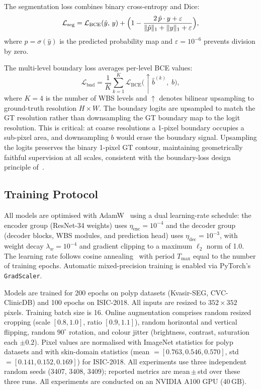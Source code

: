 \documentclass[journal]{IEEEtran}
\begin{document}
The segmentation loss combines binary cross-entropy and Dice:
\begin{equation}
  \mathcal{L}_{\text{seg}} =
    \mathcal{L}_{\text{BCE}}(\hat{y},\,y)
    + \Bigl(1 -
      \frac{2\,\hat{p}\cdot y + \varepsilon}{\|\hat{p}\|_1 + \|y\|_1 + \varepsilon}
    \Bigr),
  \label{eq:seg_loss}
\end{equation}
where $\hat{p} = \sigma(\hat{y})$ is the predicted probability map and
$\varepsilon = 10^{-6}$ prevents division by zero.

The multi-level boundary loss averages per-level BCE values:
\begin{equation}
  \mathcal{L}_{\text{bnd}} = \frac{1}{K}\sum_{k=1}^{K}
    \mathcal{L}_{\text{BCE}}\!\bigl(\uparrow\!\hat{b}^{(k)},\;b\bigr),
  \label{eq:bnd_loss}
\end{equation}
where $K = 4$ is the number of WBS levels and $\uparrow$ denotes bilinear
upsampling to ground-truth resolution $H \times W$.
The boundary logits are upsampled to match the GT resolution rather than
downsampling the GT boundary map to the logit resolution.
This is critical: at coarse resolutions a 1-pixel boundary occupies a
sub-pixel area, and downsampling $b$ would erase the boundary signal.
Upsampling the logits preserves the binary 1-pixel GT contour, maintaining
geometrically faithful supervision at all scales, consistent with the
boundary-loss design principle of~\cite{kervadec2019boundaryloss}.

\subsection{Training Protocol}\label{sec:method:training}

All models are optimised with AdamW~\cite{loshchilov2019adamw} using a
dual learning-rate schedule: the encoder group (ResNet-34 weights) uses
$\eta_{\text{enc}} = 10^{-4}$ and the decoder group (decoder blocks, WBS
modules, and prediction head) uses $\eta_{\text{dec}} = 10^{-3}$, with
weight decay $\lambda_w = 10^{-4}$ and gradient clipping to a maximum
$\ell_2$ norm of 1.0.
The learning rate follows cosine annealing~\cite{loshchilov2017cosine} with
period $T_{\text{max}}$ equal to the number of training epochs.
Automatic mixed-precision training is enabled via PyTorch's
\texttt{GradScaler}.

Models are trained for 200 epochs on polyp datasets (Kvasir-SEG,
CVC-ClinicDB) and 100 epochs on ISIC-2018.
All inputs are resized to $352 \times 352$ pixels.
Training batch size is 16.
Online augmentation comprises random resized cropping (scale $[0.8,1.0]$,
ratio $[0.9,1.1]$), random horizontal and vertical flipping, random
$90^\circ$ rotation, and colour jitter (brightness, contrast, saturation
each $\pm0.2$).
Pixel values are normalised with ImageNet statistics for polyp datasets
and with skin-domain statistics (mean $= [0.763, 0.546, 0.570]$,
std $= [0.141, 0.152, 0.169]$) for ISIC-2018.
All experiments use three independent random seeds (3407, 3408, 3409);
reported metrics are mean\,$\pm$\,std over these three runs.
All experiments are conducted on an NVIDIA A100 GPU (40\,GB).
\end{document}
